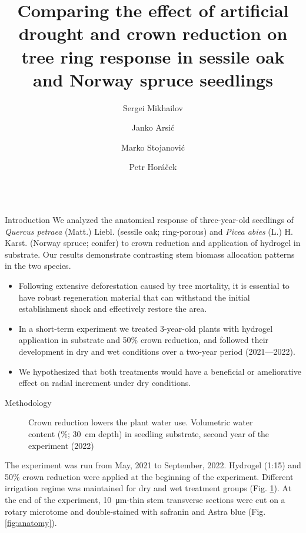 \documentclass[final]{beamer}
\title{Comparing the effect of artificial drought and crown reduction on tree ring response in sessile oak and Norway spruce seedlings}
\author{Sergei Mikhailov \inst{1-3} \and Janko Arsić \inst{1-2} \and Marko Stojanović \inst{2} \and Petr Horáček \inst{1-2}}
\institute[MendelU]{\inst{1} Mendel University in Brno, CZ \samelineand \inst{2} Global Change Research Institute CAS, CZ \\ \inst{3} Komarov Botanical Institute RAS, RU}
\newlength{\sepwidth}
\newlength{\colwidth}
\newcommand{\separatorcolumn}{\begin{column}{\sepwidth}\end{column}}
\begin{document}
\begin{frame}[t]
\begin{columns}[t]


\begin{column}{\colwidth}

\begin{alertblock}{Introduction}
    We analyzed the anatomical response of three-year-old seedlings of \textit{Quercus petraea} (Matt.) Liebl. (sessile oak; ring-porous) and \textit{Picea abies} (L.) H. Karst. (Norway spruce; conifer)  to crown reduction and application of hydrogel in substrate.
    Our results demonstrate contrasting stem biomass allocation patterns in the two species.
\begin{itemize}
    \item Following extensive deforestation caused by tree mortality, it is essential to have robust regeneration material that can withstand the initial establishment shock and effectively restore the area.
    \item In a short-term experiment we treated 3-year-old plants with hydrogel application in substrate and 50\% crown reduction, and followed their development in dry and wet conditions over a two-year period (2021---2022).
    \item We hypothesized that both treatments would have a beneficial or ameliorative effect on radial increment under dry conditions.
\end{itemize}
\end{alertblock}

\begin{block}{Methodology}
\begin{minipage}[t]{0.45\textwidth}
    \begin{figure}
        
        \caption{Crown reduction lowers the plant water use. Volumetric water content (\%; \SI{30}{\centi\meter} depth) in seedling substrate, second year of the experiment (2022)}
        \label{fig:vwc}
    \end{figure}
\end{minipage}\hfill
\normalsize
\begin{minipage}[t]{0.45\textwidth}
    The experiment was run from May, 2021 to September, 2022.
    Hydrogel (1:15) and 50\% crown reduction were applied at the beginning of the experiment.
    Different irrigation regime was maintained for dry and wet treatment groups (Fig. \ref{fig:vwc}).
    At the end of the experiment, \SI{10}{\micro\meter}-thin stem transverse sections were cut on a rotary microtome and double-stained with safranin and Astra blue (Fig. \ref{fig:anatomy}).


\end{minipage}
\end{block}
\end{column}
\end{columns}
\end{frame}
\end{document}
